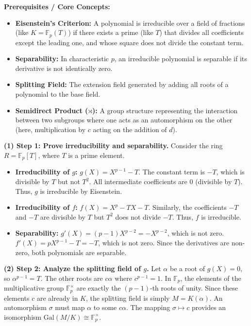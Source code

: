 \begin{solution}
\textbf{Prerequisites / Core Concepts:}
\begin{itemize}
    \item \textbf{Eisenstein's Criterion:} A polynomial is irreducible over a field of fractions (like $K = \mathbb{F}_p(T)$) if there exists a prime (like $T$) that divides all coefficients except the leading one, and whose square does not divide the constant term.
    \item \textbf{Separability:} In characteristic $p$, an irreducible polynomial is separable if its derivative is not identically zero.
    \item \textbf{Splitting Field:} The extension field generated by adding all roots of a polynomial to the base field.
    \item \textbf{Semidirect Product ($\rtimes$):} A group structure representing the interaction between two subgroups where one acts as an automorphism on the other (here, multiplication by $c$ acting on the addition of $d$).
\end{itemize}

\textbf{(1) Step 1: Prove irreducibility and separability.}
Consider the ring $R = \mathbb{F}_p[T]$, where $T$ is a prime element.
\begin{itemize}
    \item \textbf{Irreducibility of $g$:} $g(X) = X^{p-1} - T$. The constant term is $-T$, which is divisible by $T$ but not $T^2$. All intermediate coefficients are $0$ (divisible by $T$). Thus, $g$ is irreducible by Eisenstein.
    \item \textbf{Irreducibility of $f$:} $f(X) = X^p - TX - T$. Similarly, the coefficients $-T$ and $-T$ are divisible by $T$ but $T^2$ does not divide $-T$. Thus, $f$ is irreducible.
    \item \textbf{Separability:} $g'(X) = (p-1)X^{p-2} = -X^{p-2}$, which is not zero. $f'(X) = pX^{p-1} - T = -T$, which is not zero. Since the derivatives are non-zero, both polynomials are separable.
\end{itemize}

\textbf{(2) Step 2: Analyze the splitting field of $g$.}
Let $\alpha$ be a root of $g(X) = 0$, so $\alpha^{p-1} = T$.
The other roots are $c \alpha$ where $c^{p-1} = 1$. In $\mathbb{F}_p$, the elements of the multiplicative group $\mathbb{F}_p^\times$ are exactly the $(p-1)$-th roots of unity.
Since these elements $c$ are already in $K$, the splitting field is simply $M = K(\alpha)$.
An automorphism $\sigma$ must map $\alpha$ to some $c\alpha$. The mapping $\sigma \mapsto c$ provides an isomorphism $\text{Gal}(M/K) \cong \mathbb{F}_p^\times$.


\end{solution}
